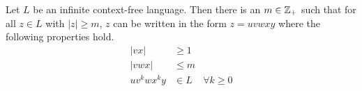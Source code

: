 \documentclass{article}
\begin{document}
\begin{lemma}
    Let $L$ be an infinite context-free language.
    Then there is an $m \in \mathbb{Z}_+$ such that for all $z \in L$ with $\vert z \vert \geq m$, $z$ can be written in the form $z = uvwxy$ where the following properties hold.
    \begin{align*}
        \vert vx \vert  & \geq 1                    \\
        \vert vwx \vert & \leq m                    \\
        u v^k w x^k y   & \in L  & \forall k \geq 0
    \end{align*}
\end{lemma}

\todoinline{\dots}
\end{document}
